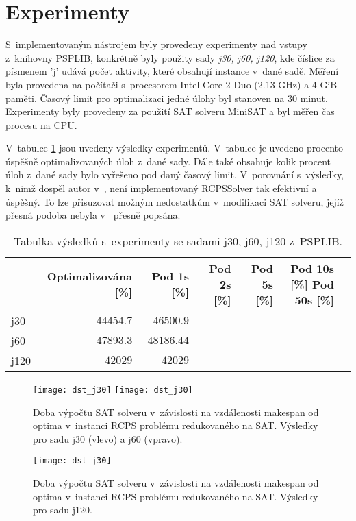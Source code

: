 \documentclass[a4paper, 12pt]{article}
\begin{document}
\section{Experimenty}
S~implementovaným nástrojem byly provedeny experimenty nad vstupy
z~knihovny PSPLIB, konkrétně byly použity sady \emph{j30, j60, j120}, kde
číslice za písmenem 'j' udává počet aktivity, které obsahují instance v~dané sadě.
Měření byla provedena na počítači s~procesorem Intel Core 2 Duo (2.13 GHz) a 4 GiB paměti.
Časový limit pro optimalizaci jedné úlohy byl stanoven na $30$ minut.
Experimenty byly provedeny za použití SAT solveru MiniSAT a byl měřen čas
procesu na CPU.

V~tabulce \ref{table:jreses} jsou uvedeny výsledky experimentů.
V~tabulce je uvedeno procento úspěšně optimalizovaných úloh z~dané sady.
Dále také obsahuje kolik procent úloh z~dané sady bylo vyřešeno pod daný časový limit.
V~porovnání s~výsledky, k~nimž dospěl autor v~\cite{horbach:10}, není implementovaný
RCPSSolver tak efektivní a úspěšný.
To lze přisuzovat možným nedostatkům v~modifikaci SAT solveru, jejíž přesná podoba nebyla
v~\cite{horbach:10} přesně popsána.

\begin{table}[tb]
\begin{center}
  \begin{tabular}{ | l | r | r | r | r | r | r |}
   \hline
    & \textbf{Optimalizována [\%]} & Pod 1s [\%] & Pod 2s [\%] & Pod 5s [\%] & Pod 10s [\%] Pod 50s [\%]\\ \hline \hline
    j30 &$44454.7$ & $46500.9$ & & & \\ \hline
    j60 & $47893.3$ & $48186.44$ & & & \\ \hline
    j120 & $42 029$ & $42 029$ & & & \\ \hline
   \end{tabular}
   \caption{Tabulka výsledků s~experimenty se sadami j30, j60, j120 z~PSPLIB.}
   \label{table:jreses}
\end{center}
\end{table}

\begin{figure}[tb]
    \texttt{[image: dst\_j30]}
    \texttt{[image: dst\_j30]}
    \caption{Doba výpočtu SAT solveru v~závislosti na vzdálenosti makespan od optima v~instanci RCPS problému redukovaného na SAT.
    Výsledky pro sadu j30 (vlevo) a j60 (vpravo).}
    \label{pic:j30}
\end{figure}
\begin{figure}[tb]
    \begin{center}
    \texttt{[image: dst\_j30]}
    \end{center}
    \caption{Doba výpočtu SAT solveru v~závislosti na vzdálenosti makespan od optima v~instanci RCPS problému redukovaného na SAT.
    Výsledky pro sadu j120.}
    \label{pic:j120}
\end{figure}
\end{document}
